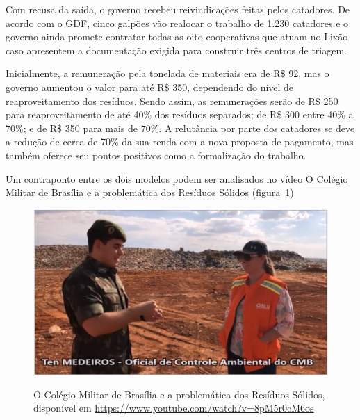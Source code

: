 Com recusa da saída, o governo recebeu reivindicações feitas pelos catadores. De acordo com o GDF, cinco galpões vão realocar o trabalho de 1.230 catadores e o governo ainda promete contratar todas as oito cooperativas que atuam no Lixão caso apresentem a documentação exigida para construir três centros de triagem.

Inicialmente, a remuneração pela tonelada de materiais era de R\$ 92, mas o governo aumentou o valor para até R\$ 350, dependendo do nível de reaproveitamento dos resíduos. Sendo assim, as remunerações serão de R\$ 250 para reaproveitamento de até 40\% dos resíduos separados; de R\$ 300 entre 40\% a 70\%; e de R\$ 350 para mais de 70\%. A relutância por parte dos catadores se deve a redução de cerca de 70\% da sua renda com a nova proposta de pagamento, mas  também oferece seu pontos positivos como a formalização do trabalho. \nocite{CidadesInteligentes2018Lixao}

Um contraponto entre os dois modelos podem ser analisados no vídeo \href{https://www.youtube.com/watch?v=8pM5r0cM6os}{O Colégio Militar de Brasília e a problemática dos Resíduos Sólidos} (figura~\ref{fig:colegio-militar-no-aterro}) \nocite{CMB20180616}

\begin{figure}[h!]
    \centering
    \href{https://www.youtube.com/watch?v=8pM5r0cM6os}{
        \includegraphics[width=0.7\linewidth]{fig/Colegio-Militar-no-Aterro}
    }
    \caption{O Colégio Militar de Brasília e a problemática dos Resíduos Sólidos, disponível em \url{https://www.youtube.com/watch?v=8pM5r0cM6os}}
    \label{fig:colegio-militar-no-aterro}
\end{figure}

